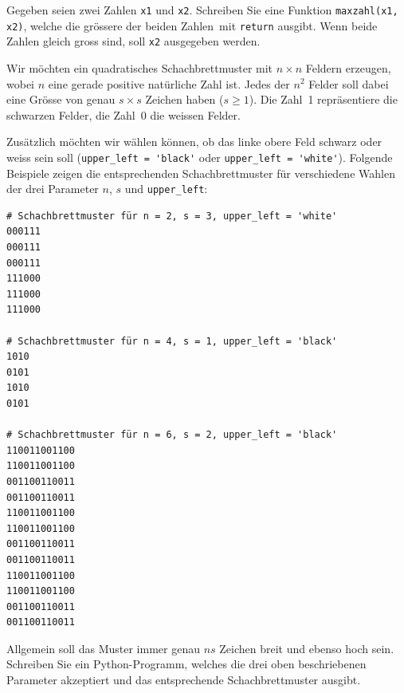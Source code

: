 \begin{myexercise}
	Gegeben seien zwei Zahlen \lstinline|x1| und \lstinline|x2|. Schreiben Sie eine Funktion \lstinline|maxzahl(x1, x2)|, welche die grössere der beiden Zahlen mit \lstinline|return| ausgibt. Wenn beide Zahlen gleich gross sind, soll \lstinline|x2| ausgegeben werden.

	\begin{myanswer}
		
	\end{myanswer}
\end{myexercise}

\begin{mychallenge}


	Wir möchten ein quadratisches Schachbrettmuster mit $n \times n$ Feldern erzeugen, wobei $n$ eine gerade positive natürliche Zahl ist. Jedes der $n^2$ Felder soll dabei eine Grösse von genau $s \times s$ Zeichen haben ($s \geq 1$). Die Zahl~1 repräsentiere die schwarzen Felder, die Zahl~0 die weissen Felder.

	Zusätzlich möchten wir wählen können, ob das linke obere Feld schwarz oder weiss sein soll (\lstinline|upper_left = 'black'| oder \lstinline|upper_left = 'white'|). Folgende Beispiele zeigen die entsprechenden Schachbrettmuster für verschiedene Wahlen der drei Parameter $n$, $s$ und \lstinline|upper_left|:

	\begin{verbatim}
# Schachbrettmuster für n = 2, s = 3, upper_left = 'white'
000111
000111
000111
111000
111000
111000

# Schachbrettmuster für n = 4, s = 1, upper_left = 'black'
1010
0101
1010
0101

# Schachbrettmuster für n = 6, s = 2, upper_left = 'black'
110011001100
110011001100
001100110011
001100110011
110011001100
110011001100
001100110011
001100110011
110011001100
110011001100
001100110011
001100110011
\end{verbatim}

	Allgemein soll das Muster immer genau $ns$ Zeichen breit und ebenso hoch sein. Schreiben Sie ein Python-Programm, welches die drei oben beschriebenen Parameter akzeptiert und das entsprechende Schachbrettmuster ausgibt.
	\begin{myanswer}
		
	\end{myanswer}
\end{mychallenge}

